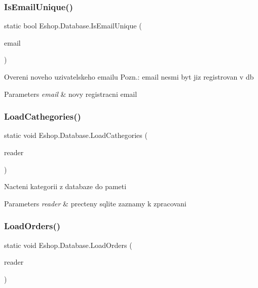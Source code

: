 \subsubsection{\texorpdfstring{IsEmailUnique()}{IsEmailUnique()}}
{\footnotesize\ttfamily static bool Eshop.\+Database.\+Is\+Email\+Unique (\begin{DoxyParamCaption}\item[{string}]{email }\end{DoxyParamCaption})\hspace{0.3cm}{\ttfamily [static]}}



Overeni noveho uzivatelskeho emailu Pozn.\+: email nesmi byt jiz registrovan v db 


\begin{DoxyParams}{Parameters}
{\em email} & novy registracni email\\
\hline
\end{DoxyParams}
\mbox{\label{class_eshop_1_1_database_a740a0b27bde20b1000993f96550a570d}} 
\subsubsection{\texorpdfstring{LoadCathegories()}{LoadCathegories()}}
{\footnotesize\ttfamily static void Eshop.\+Database.\+Load\+Cathegories (\begin{DoxyParamCaption}\item[{S\+Q\+Lite\+Data\+Reader}]{reader }\end{DoxyParamCaption})\hspace{0.3cm}{\ttfamily [static]}}



Nacteni kategorii z databaze do pameti 


\begin{DoxyParams}{Parameters}
{\em reader} & precteny sqlite zaznamy k zpracovani\\
\hline
\end{DoxyParams}
\mbox{\label{class_eshop_1_1_database_ac17365c3ead366345290d2e8919f0e1a}} 
\subsubsection{\texorpdfstring{LoadOrders()}{LoadOrders()}}
{\footnotesize\ttfamily static void Eshop.\+Database.\+Load\+Orders (\begin{DoxyParamCaption}\item[{S\+Q\+Lite\+Data\+Reader}]{reader }\end{DoxyParamCaption})\hspace{0.3cm}{\ttfamily [static]}}



